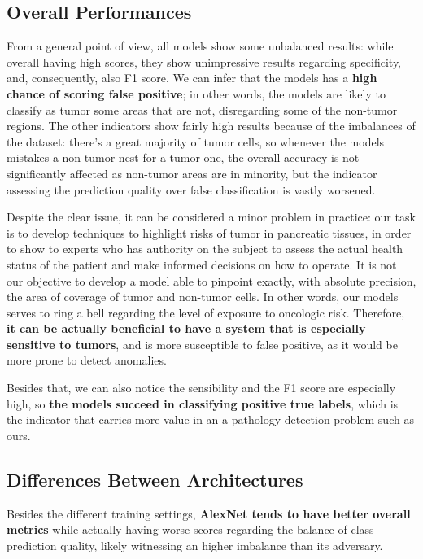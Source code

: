 \subsection{Overall Performances}

\par
From a general point of view, all models show some unbalanced results: while overall having high scores, they show unimpressive results regarding specificity, and, consequently, also F1 score. We can infer that the models has a \textbf{high chance of scoring false positive}; in other words, the models are likely to classify as tumor some areas that are not, disregarding some of the non-tumor regions. The other indicators show fairly high results because of the imbalances of the dataset: there's a great majority of tumor cells, so whenever the models mistakes a non-tumor nest for a tumor one, the overall accuracy is not significantly affected as non-tumor areas are in minority, but the indicator assessing the prediction quality over false classification is vastly worsened. 

\par
Despite the clear issue, it can be considered a minor problem in practice: our task is to develop techniques to highlight risks of tumor in pancreatic tissues, in order to show to experts who has authority on the subject to assess the actual health status of the patient and make informed decisions on how to operate. It is not our objective to develop a model able to pinpoint exactly, with absolute precision, the area of coverage of tumor and non-tumor cells. In other words, our models serves to ring a bell regarding the level of exposure to oncologic risk. Therefore, \textbf{it can be actually beneficial to have a system that is especially sensitive to tumors}, and is more susceptible to false positive, as it would be more prone to detect anomalies.

\par Besides that, we can also notice the sensibility and the F1 score are especially high, so \textbf{the models succeed in classifying positive true labels}, which is the indicator that carries more value in an a pathology detection problem such as ours.

\subsection{Differences Between Architectures}

\par
Besides the different training settings, \textbf{AlexNet tends to have better overall metrics} while actually having worse scores regarding the balance of class prediction quality, likely witnessing an higher imbalance than its adversary.

